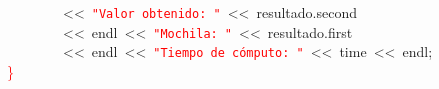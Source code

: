 \mbox{}\ \ \ \ \ \ \ \ \textcolor{BrickRed}{\textless{}\textless{}}\ \texttt{\textcolor{Red}{"{}Valor\ obtenido:\ "{}}}\ \textcolor{BrickRed}{\textless{}\textless{}}\ resultado\textcolor{BrickRed}{.}second\  \\
\mbox{}\ \ \ \ \ \ \ \ \textcolor{BrickRed}{\textless{}\textless{}}\ endl\ \textcolor{BrickRed}{\textless{}\textless{}}\ \texttt{\textcolor{Red}{"{}Mochila:\ "{}}}\ \textcolor{BrickRed}{\textless{}\textless{}}\ resultado\textcolor{BrickRed}{.}first\  \\
\mbox{}\ \ \ \ \ \ \ \ \textcolor{BrickRed}{\textless{}\textless{}}\ endl\ \textcolor{BrickRed}{\textless{}\textless{}}\ \texttt{\textcolor{Red}{"{}Tiempo\ de\ cómputo:\ "{}}}\ \textcolor{BrickRed}{\textless{}\textless{}}\ time\ \textcolor{BrickRed}{\textless{}\textless{}}\ endl\textcolor{BrickRed}{;} \\
\mbox{}\textcolor{Red}{\}} \\
\mbox{}
